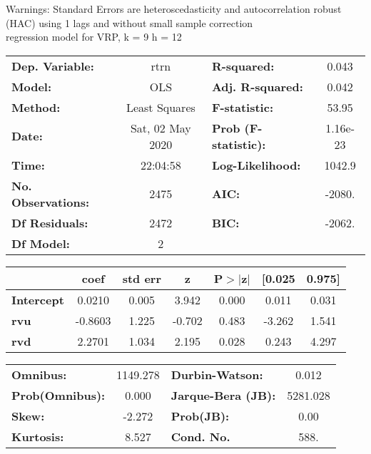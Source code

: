 Warnings: \newline
 [1] Standard Errors are heteroscedasticity and autocorrelation robust (HAC) using 1 lags and without small sample correction\\ 

regression model for VRP, k = 9 h = 12\begin{center}
\begin{tabular}{lclc}
\toprule
\textbf{Dep. Variable:}    &       rtrn       & \textbf{  R-squared:         } &     0.043   \\
\textbf{Model:}            &       OLS        & \textbf{  Adj. R-squared:    } &     0.042   \\
\textbf{Method:}           &  Least Squares   & \textbf{  F-statistic:       } &     53.95   \\
\textbf{Date:}             & Sat, 02 May 2020 & \textbf{  Prob (F-statistic):} &  1.16e-23   \\
\textbf{Time:}             &     22:04:58     & \textbf{  Log-Likelihood:    } &    1042.9   \\
\textbf{No. Observations:} &        2475      & \textbf{  AIC:               } &    -2080.   \\
\textbf{Df Residuals:}     &        2472      & \textbf{  BIC:               } &    -2062.   \\
\textbf{Df Model:}         &           2      & \textbf{                     } &             \\
\bottomrule
\end{tabular}
\begin{tabular}{lcccccc}
                   & \textbf{coef} & \textbf{std err} & \textbf{z} & \textbf{P$> |$z$|$} & \textbf{[0.025} & \textbf{0.975]}  \\
\midrule
\textbf{Intercept} &       0.0210  &        0.005     &     3.942  &         0.000        &        0.011    &        0.031     \\
\textbf{rvu}       &      -0.8603  &        1.225     &    -0.702  &         0.483        &       -3.262    &        1.541     \\
\textbf{rvd}       &       2.2701  &        1.034     &     2.195  &         0.028        &        0.243    &        4.297     \\
\bottomrule
\end{tabular}
\begin{tabular}{lclc}
\textbf{Omnibus:}       & 1149.278 & \textbf{  Durbin-Watson:     } &    0.012  \\
\textbf{Prob(Omnibus):} &   0.000  & \textbf{  Jarque-Bera (JB):  } & 5281.028  \\
\textbf{Skew:}          &  -2.272  & \textbf{  Prob(JB):          } &     0.00  \\
\textbf{Kurtosis:}      &   8.527  & \textbf{  Cond. No.          } &     588.  \\
\bottomrule
\end{tabular}
\end{center}

